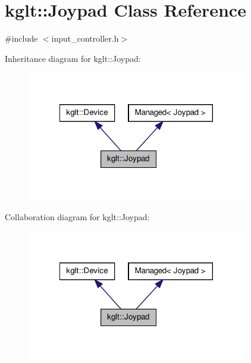 \hypertarget{classkglt_1_1_joypad}{\section{kglt\-:\-:Joypad Class Reference}
\label{classkglt_1_1_joypad}
}


{\ttfamily \#include $<$input\-\_\-controller.\-h$>$}



Inheritance diagram for kglt\-:\-:Joypad\-:\nopagebreak
\begin{figure}[H]
\begin{center}
\leavevmode
\includegraphics[width=272pt]{classkglt_1_1_joypad__inherit__graph}
\end{center}
\end{figure}


Collaboration diagram for kglt\-:\-:Joypad\-:\nopagebreak
\begin{figure}[H]
\begin{center}
\leavevmode
\includegraphics[width=272pt]{classkglt_1_1_joypad__coll__graph}
\end{center}
\end{figure}

